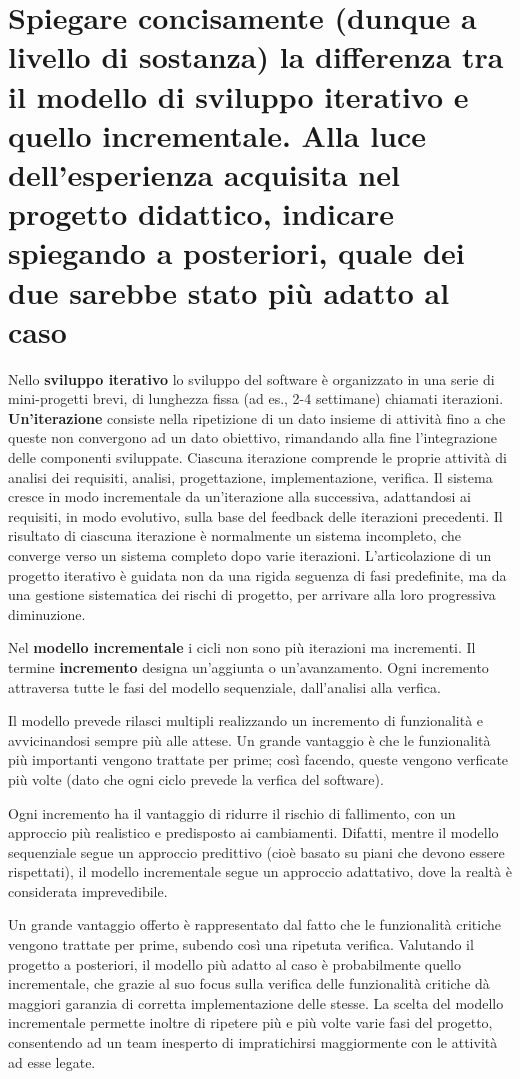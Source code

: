 \section{Spiegare concisamente (dunque a livello di sostanza) la differenza tra il modello di sviluppo iterativo e quello incrementale. Alla luce dell'esperienza acquisita nel progetto didattico, indicare spiegando a posteriori, quale dei due sarebbe stato più adatto al caso}

Nello \textbf{sviluppo iterativo} lo sviluppo del software è organizzato in una serie di mini-progetti brevi, di lunghezza fissa (ad es., 2-4 settimane) chiamati iterazioni. \textbf{Un'iterazione} consiste nella ripetizione di un dato insieme di attività fino a che queste non convergono ad un dato obiettivo, rimandando alla fine l’integrazione delle componenti sviluppate. Ciascuna iterazione comprende le proprie attività di analisi dei requisiti, analisi, progettazione, implementazione, verifica.  Il sistema cresce in modo incrementale da un'iterazione alla successiva, adattandosi ai requisiti, in modo evolutivo, sulla base del feedback delle iterazioni precedenti. Il risultato di ciascuna iterazione è normalmente un sistema incompleto, che converge verso un sistema completo dopo varie iterazioni.
L'articolazione di un progetto iterativo è guidata non da una rigida seguenza di fasi predefinite, ma da una gestione sistematica dei rischi di progetto, per arrivare alla loro progressiva diminuzione.


Nel \textbf{modello incrementale} i cicli non sono più iterazioni ma incrementi. Il termine \textbf{incremento} designa un'aggiunta o un'avanzamento. Ogni incremento attraversa tutte le fasi del modello sequenziale, dall'analisi alla verfica.

Il modello prevede rilasci multipli realizzando un incremento di funzionalità e avvicinandosi sempre più alle attese. Un grande vantaggio è che le funzionalità più importanti vengono trattate per prime; così facendo, queste vengono verficate più volte (dato che ogni ciclo prevede la verfica del software). 

Ogni incremento ha il vantaggio di ridurre il rischio di fallimento, con un approccio più realistico e predisposto ai cambiamenti. Difatti, mentre il modello sequenziale segue un approccio predittivo (cioè basato su piani che devono essere rispettati), il modello incrementale segue un approccio adattativo, dove la realtà è considerata imprevedibile. 

Un grande vantaggio offerto è rappresentato dal fatto che le funzionalità critiche vengono trattate per prime, subendo così una ripetuta verifica.
Valutando il progetto a posteriori, il modello più adatto al caso è probabilmente quello incrementale, che grazie al suo focus sulla verifica delle funzionalità critiche dà maggiori garanzia di corretta implementazione delle stesse. La scelta del modello incrementale permette inoltre di ripetere più e più volte varie fasi del progetto, consentendo ad un team inesperto di impratichirsi maggiormente con le attività ad esse legate.